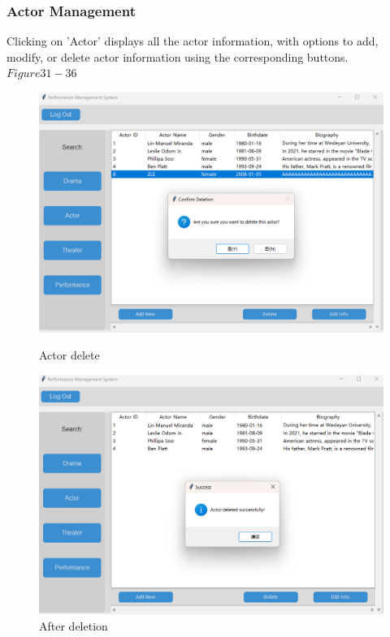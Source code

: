 \documentclass[12pt]{article}
\begin{document}
\subsubsection{Actor Management}
\par Clicking on 'Actor' displays all the actor information, with options to add, modify, or delete actor information using the corresponding buttons.\(Figure31-36\)
\begin{figure}[H]
    \centering
    \begin{minipage}{0.48\textwidth}
        \centering
        \includegraphics[width=\textwidth]{31.png}
        \caption{Actor delete} 
        \label{Figure 31}
    \end{minipage}
    \hfill
    \begin{minipage}{0.48\textwidth}
        \centering
        \includegraphics[width=\textwidth]{32.png}
        \caption{After deletion}
        \label{Figure 32}
    \end{minipage}
\end{figure}
\end{document}
